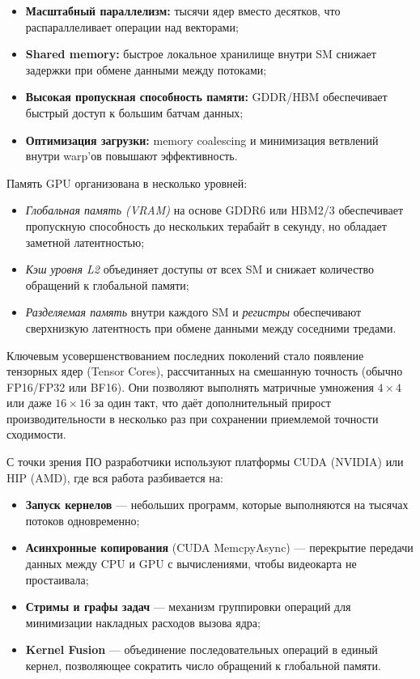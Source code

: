 \begin{itemize}
  \item \textbf{Масштабный параллелизм:} тысячи ядер вместо десятков, что распараллеливает операции над векторами;
  \item \textbf{Shared memory:} быстрое локальное хранилище внутри SM снижает задержки при обмене данными между потоками;
  \item \textbf{Высокая пропускная способность памяти:} GDDR/HBM обеспечивает быстрый доступ к большим батчам данных;
  \item \textbf{Оптимизация загрузки:} memory coalescing и минимизация ветвлений внутри warp’ов повышают эффективность.
\end{itemize}

Память GPU организована в несколько уровней:  
\begin{itemize}  
  \item \emph{Глобальная память (VRAM)} на основе GDDR6 или HBM2/3 обеспечивает пропускную способность до нескольких терабайт в секунду, но обладает заметной латентностью;
  \item \emph{Кэш уровня L2} объединяет доступы от всех SM и снижает количество обращений к глобальной памяти;
  \item \emph{Разделяемая память} внутри каждого SM и \emph{регистры} обеспечивают сверхнизкую латентность при обмене данными между соседними тредами.
\end{itemize}  

Ключевым усовершенствованием последних поколений стало появление тензорных ядер (Tensor Cores), рассчитанных на смешанную точность (обычно FP16/FP32 или BF16). Они позволяют выполнять матричные умножения $4\times4$ или даже $16\times16$ за один такт, что даёт дополнительный прирост производительности в несколько раз при сохранении приемлемой точности сходимости.  

С точки зрения ПО разработчики используют платформы CUDA (NVIDIA) или HIP (AMD), где вся работа разбивается на:  
\begin{itemize}  
  \item \textbf{Запуск кернелов} — небольших программ, которые выполняются на тысячах потоков одновременно;
  \item \textbf{Асинхронные копирования} (CUDA MemcpyAsync) — перекрытие передачи данных между CPU и GPU с вычислениями, чтобы видеокарта не простаивала;
  \item \textbf{Стримы и графы задач} — механизм группировки операций для минимизации накладных расходов вызова ядра;
  \item \textbf{Kernel Fusion} — объединение последовательных операций в единый кернел, позволяющее сократить число обращений к глобальной памяти.  
\end{itemize}  

